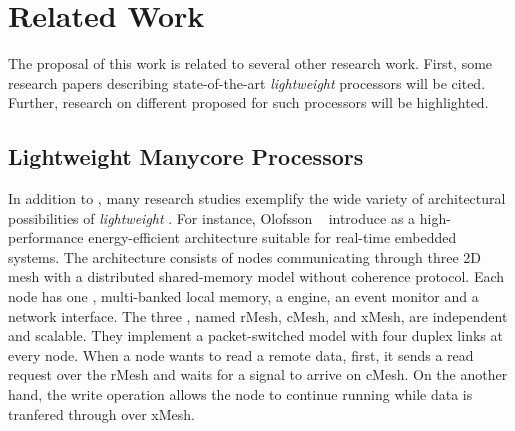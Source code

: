 \chapter{Related Work}
\label{ch.related-work}

The proposal of this work is related to several other research work.
First, some research papers describing state-of-the-art \textit{lightweight} \manycores
processors will be cited. Further, research on different \oss
proposed for such processors will be highlighted.

\section{Lightweight Manycore Processors}
\label{sec.works.manycores}

	In addition to \mppa, many research studies exemplify the wide variety of
	architectural possibilities of \textit{lightweight} \manycores.
	For instance, Olofsson \etal~\cite{olofsson2014} introduce \epiphany as a
	high-performance energy-efficient \manycore architecture suitable for
	real-time embedded systems.
	The architecture consists of nodes communicating through three 2D mesh \nocs
	with a distributed shared-memory model without coherence protocol.
	Each node has one \risc \cpu, multi-banked local memory, a \dma engine,
	an event monitor and a network interface.
	The three \nocs, named rMesh, cMesh, and xMesh, are independent and scalable.
	They implement a packet-switched model with four duplex links at every node.
	When a node wants to read a remote data, first, it sends a read request over
	the rMesh and waits for a signal to arrive on cMesh.
	On the another hand, the write operation allows the node to continue running
	while data is tranfered through over xMesh.


